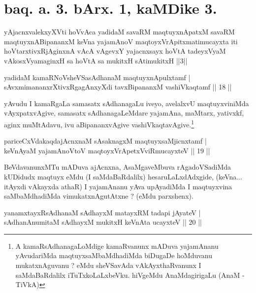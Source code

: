 \section*{baq. a. 3. bArx. 1, kaMDike 3.}

\begin{shl}
yAjacnxvalekxyXVti hoVvAca yadidaM savaRM maqtuyxnApatxM savaRM maqtuyxnABipananxM keVna yajamAnoV maqtoyxVrApitxmatimucayxta iti hoVtarxtivxRjAginxnA vAcA vAgevxY yajacnxsayx hoVtA tadeyxVyaM vAkosxV\s yamaginxH sa hoVtA sa mukitxH sAtimukitxH ||3||
\end{shl}


\begin{shl}
yadidaM kamaRNoV\s sheVSasAdhanaM maqtuyxnA\s \s pulxtamf |\\
sAvxmimananxrXtivxRgagAnxyXdi tavxBipananxM vashiVkaqtamf \hfill || 18 ||
\end{shl}

\begin{artha}
yAvudu I kamaRgaLa samasatx sAdhanagaLu iveyo, avelalxvU maqtuyx\-viniMda vAyxpatxvAgive, samasatx sAdhanagaLeMdare yajamAna, maMtarx, yativxkf, aginx muMtAdavu, ivu aBipananxvAgive vashiVkaqtavAgive.\footnote[3]{A kamaRsAdhanagaLoMdige kamaRvanunx mADuva yajamAnanu yAvudariMda maqtuyxsaMbaMdhadiMda biDugaDe hoMduvanu mukatxnAguvanu ? eMdu sheVSavAda vAkAyxthaRvanunx I \-saMdaBaRdalilx iTuTxkoLaLxbeVku. hiVgeMdu AnaMdagirigaLu (AnaM - TiVkA)}
\end{artha}


\begin{shl}
pariceCxVdakaqdajAcnxnaM sAsaknagxM maqtuyxsaMjicnxtamf |\\
keVnAyaM yajamAnoV\s toV maqtoyxVrApetxVviRmucayxteV \hfill || 19 ||
\end{shl}

\begin{artha}
BeVdavanunxMTu mADuva ajAcnxna, AsaMgaveMbuva rAgadoVSadiMda kUDidudx maqtuyx eMdu (I saMdaBaRdalilx) hesaruLaLxdAdxgide, (keVna... itAyxdi vAkayxda athaR) I yajamAnanu yAva upAyadiMda I maqtuyxvina saMbaMdhadiMda vimukatxnAgutAtxne ? (eMdu parxshenx).
\end{artha}


\begin{shl}
yanamxtayxRsAdhanaM sAdhayxM matayxRM tadapi jAyateV |\\
sAdhanAnumitaM sAdhayxM mukitxH keVnAta ucayxteV \hfill || 20 ||
\end{shl}

